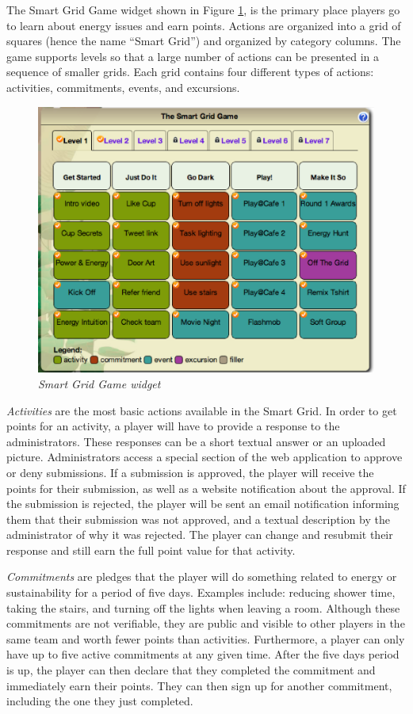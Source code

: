 The Smart Grid Game widget shown in Figure \ref{fig:SmartGrid}, is the primary place players go to learn about energy issues and earn points. Actions are organized into a grid of squares (hence the name ``Smart Grid'') and organized by category columns. The game supports levels so that a large number of actions can be presented in a sequence of smaller grids. Each grid contains four different types of actions: activities, commitments, events, and excursions.

\begin{figure}[th]
  \center
  \includegraphics[width=0.95\columnwidth]{smart-grid.eps}
  \caption{\em Smart Grid Game widget}
  \label{fig:SmartGrid}
\end{figure}

{\em Activities} are the most basic actions available in the Smart Grid. In order to get points for an activity, a player will have to provide a response to the administrators. These responses can be a short textual answer or an uploaded picture. Administrators access a special section of the web application to approve or deny submissions. If a submission is approved, the player will receive the points for their submission, as well as a website notification about the approval. If the submission is rejected, the player will be sent an email notification informing them that their submission was not approved, and a textual description by the administrator of why it was rejected. The player can change and resubmit their response and still earn the full point value for that activity.

{\em Commitments} are pledges that the player will do something related to energy or sustainability for a period of five days. Examples include: reducing shower time, taking the stairs, and turning off the lights when leaving a room. Although these commitments are not verifiable, they are public and visible to other players in the same team and worth fewer points than activities. Furthermore, a player can only have up to five active commitments at any given time. After the five days period is up, the player can then declare that they completed the commitment and immediately earn their points. They can then sign up for another commitment, including the one they just completed.

